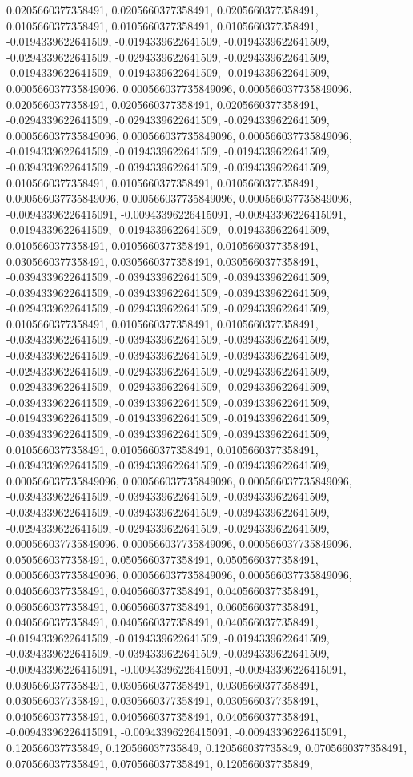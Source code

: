\documentclass[
  ,man]{apa6}
\begin{document}
0.0205660377358491, 0.0205660377358491, 0.0205660377358491, 0.0105660377358491, 0.0105660377358491, 0.0105660377358491, -0.0194339622641509, -0.0194339622641509, -0.0194339622641509, -0.0294339622641509, -0.0294339622641509, -0.0294339622641509, -0.0194339622641509, -0.0194339622641509, -0.0194339622641509, 0.000566037735849096, 0.000566037735849096, 0.000566037735849096, 0.0205660377358491, 0.0205660377358491, 0.0205660377358491, -0.0294339622641509, -0.0294339622641509, -0.0294339622641509, 0.000566037735849096,
0.000566037735849096, 0.000566037735849096, -0.0194339622641509, -0.0194339622641509, -0.0194339622641509, -0.0394339622641509, -0.0394339622641509, -0.0394339622641509, 0.0105660377358491, 0.0105660377358491, 0.0105660377358491, 0.000566037735849096, 0.000566037735849096, 0.000566037735849096, -0.00943396226415091, -0.00943396226415091, -0.00943396226415091, -0.0194339622641509, -0.0194339622641509, -0.0194339622641509, 0.0105660377358491, 0.0105660377358491, 0.0105660377358491, 0.0305660377358491,
0.0305660377358491, 0.0305660377358491, -0.0394339622641509, -0.0394339622641509, -0.0394339622641509, -0.0394339622641509, -0.0394339622641509, -0.0394339622641509, -0.0294339622641509, -0.0294339622641509, -0.0294339622641509, 0.0105660377358491, 0.0105660377358491, 0.0105660377358491, -0.0394339622641509, -0.0394339622641509, -0.0394339622641509, -0.0394339622641509, -0.0394339622641509, -0.0394339622641509, -0.0294339622641509, -0.0294339622641509, -0.0294339622641509, -0.0294339622641509, -0.0294339622641509,
-0.0294339622641509, -0.0394339622641509, -0.0394339622641509, -0.0394339622641509, -0.0194339622641509, -0.0194339622641509, -0.0194339622641509, -0.0394339622641509, -0.0394339622641509, -0.0394339622641509, 0.0105660377358491, 0.0105660377358491, 0.0105660377358491, -0.0394339622641509, -0.0394339622641509, -0.0394339622641509, 0.000566037735849096, 0.000566037735849096, 0.000566037735849096, -0.0394339622641509, -0.0394339622641509, -0.0394339622641509, -0.0394339622641509, -0.0394339622641509,
-0.0394339622641509, -0.0294339622641509, -0.0294339622641509, -0.0294339622641509, 0.000566037735849096, 0.000566037735849096, 0.000566037735849096, 0.0505660377358491, 0.0505660377358491, 0.0505660377358491, 0.000566037735849096, 0.000566037735849096, 0.000566037735849096, 0.0405660377358491, 0.0405660377358491, 0.0405660377358491, 0.0605660377358491, 0.0605660377358491, 0.0605660377358491, 0.0405660377358491, 0.0405660377358491, 0.0405660377358491, -0.0194339622641509, -0.0194339622641509, -0.0194339622641509,
-0.0394339622641509, -0.0394339622641509, -0.0394339622641509, -0.00943396226415091, -0.00943396226415091, -0.00943396226415091, 0.0305660377358491, 0.0305660377358491, 0.0305660377358491, 0.0305660377358491, 0.0305660377358491, 0.0305660377358491, 0.0405660377358491, 0.0405660377358491, 0.0405660377358491, -0.00943396226415091, -0.00943396226415091, -0.00943396226415091, 0.120566037735849, 0.120566037735849, 0.120566037735849, 0.0705660377358491, 0.0705660377358491, 0.0705660377358491, 0.120566037735849,
\end{document}
